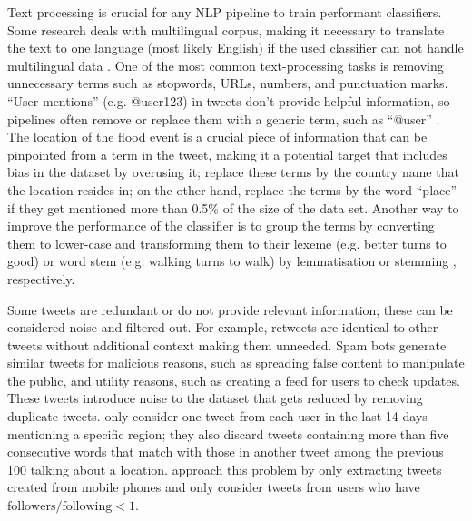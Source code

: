 Text processing is crucial for any \ac{NLP} pipeline to train performant classifiers. Some research
deals with multilingual corpus, making it necessary to translate the text to one language (most
likely English) if the used classifier can not handle multilingual data
\cite{singhEventClassificationLocation2019}. One of the most common text-processing tasks is
removing unnecessary terms such as stopwords, \ac{URL}s, numbers, and punctuation marks. ``User
mentions'' (e.g. @user123) in tweets don't provide helpful information, so pipelines often remove or
replace them with a generic term, such as ``@user'' \cite{debruijnImprovingClassificationFlood2020}.
The location of the flood event is a crucial piece of information that can be pinpointed from a term
in the tweet, making it a potential target that includes bias in the dataset by overusing it;
 replace these terms by the country name that
the location resides in; on the other hand, 
replace the terms by the word ``place'' if they get mentioned more than 0.5\% of the size of the
data set. Another way to improve the performance of the classifier is to group the terms by
converting them to lower-case and transforming them to their lexeme (e.g. better turns to good) or
word stem (e.g. walking turns to walk) by lemmatisation
\cite{petersenIdentificationExplorationExtreme2021} or stemming
\cite{fengExtractionPluvialFlood2018}, respectively.

 Some tweets are redundant or do not provide relevant information; these can be considered noise and
 filtered out. For example, retweets are identical to other tweets without additional context making
 them unneeded. Spam bots generate similar tweets for malicious reasons, such as spreading false
 content to manipulate the public, and utility reasons, such as creating a feed for users to check
 updates. These tweets introduce noise to the dataset that gets reduced by removing duplicate
 tweets.  only consider one tweet from each user in
 the last 14 days mentioning a specific region; they also discard tweets containing more than five
 consecutive words that match with those in another tweet among the previous 100 talking about a
 location.  approach this problem by only extracting
 tweets created from mobile phones and only consider tweets from users who have $\text{followers} /
 \text{following} < 1$.

